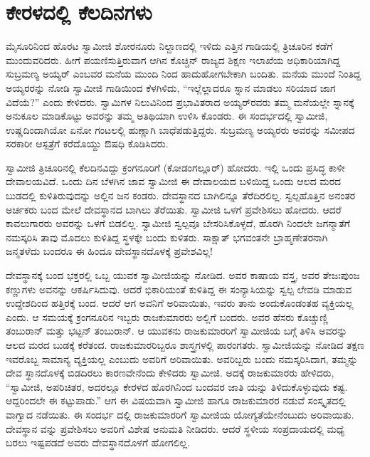 
\chapter{ಕೇರಳದಲ್ಲಿ ಕೆಲದಿನಗಳು}

\noindent

ಮೈಸೂರಿನಿಂದ ಹೊರಟ ಸ್ವಾಮೀಜಿ ಶೋರನೂರು ನಿಲ್ದಾಣದಲ್ಲಿ ಇಳಿದು ಎತ್ತಿನ ಗಾಡಿಯಲ್ಲಿ ತ್ರಿಚೂರಿನ ಕಡೆಗೆ ಮುಂದುವರಿದರು. ಹೀಗೆ ಪಯಣಿಸುತ್ತಿರುವಾಗ ಆಗಿನ ಕೊಚ್ಚಿನ್ ರಾಜ್ಯದ ಶಿಕ್ಷಣ ಇಲಾಖೆಯ ಅಧಿಕಾರಿಯಾಗಿದ್ದ ಸುಬ್ರಮಣ್ಯ ಅಯ್ಯರ್ ಎಂಬವರ ಮನೆಯ ಮುಂದಿ ನಿಂದ ಹಾದುಹೋಗಬೇಕಾಗಿ ಬಂದಿತು. ಮನೆಯ ಮುಂದೆ ನಿಂತಿದ್ದ ಅಯ್ಯರರನ್ನು ನೋಡಿ ಸ್ವಾಮೀಜಿ ಗಾಡಿಯಿಂದ ಕೆಳಗಿಳಿದು, “ಇಲ್ಲೆಲ್ಲಾದರೂ ಸ್ನಾನ ಮಾಡಲು ಸರಿಯಾದ ಜಾಗ ವಿದೆಯೆ?” ಎಂದು ಕೇಳಿದರು. ಸ್ವಾಮಿಗಳ ನಿಲುವಿನಿಂದ ಪ್ರಭಾವಿತರಾದ ಅಯ್ಯರ್​ರವರು ತಮ್ಮ ಮನೆಯಲ್ಲೇ ಸ್ನಾನಕ್ಕೆ ಅನುಕೂಲ ಮಾಡಿಕೊಟ್ಟು ಅವರನ್ನು ತಮ್ಮ ಅತಿಥಿಯಾಗಿ ಉಳಿಸಿ ಕೊಂಡರು. ಈ ಸಂದರ್ಭದಲ್ಲಿ ಸ್ವಾಮೀಜಿ, ಉಷ್ಣದಿಂದಾಗಿಯೋ ಏನೋ ಗಂಟಲಲ್ಲಿ ಹುಣ್ಣಾಗಿ ಬಾಧೆಪಡುತ್ತಿದ್ದರು. ಸುಬ್ರಮಣ್ಯ ಅಯ್ಯರರು ಅವರನ್ನು ಸಮೀಪದ ಸರಕಾರೀ ಆಸ್ಪತ್ರೆಗೆ ಕರೆದೊಯ್ದು ಔಷಧಿ ಕೊಡಿಸಿದರು.

ಸ್ವಾಮೀಜಿ ತ್ರಿಚೂರಿನಲ್ಲಿ ಕೆಲದಿನವಿದ್ದು ಕ್ರಂಗನೂರಿಗೆ (ಕೋಡಂಗಲ್ಲೂರ್​) ಹೋದರು. ಇಲ್ಲಿ ಒಂದು ಪ್ರಸಿದ್ಧ ಕಾಳೀ ದೇವಾಲಯವಿದೆ. ಒಂದು ದಿನ ಬೆಳಗಿನ ಜಾವ ಸ್ವಾಮೀಜಿ ಈ ದೇವಾಲಯದ ಬಳಿಯಿದ್ದ ಒಂದು ಆಲದ ಮರದ ಬುಡದಲ್ಲಿ ಕುಳಿತಿರುವುದನ್ನು ಅಲ್ಲಿನ ಜನ ಕಂಡರು. ದೇವಸ್ಥಾನದ ಬಾಗಿಲಿನ್ನೂ ತೆರೆದಿರಲಿಲ್ಲ. ಸ್ವಲ್ಪಹೊತ್ತಿನ ಅನಂತರ ಅರ್ಚಕರು ಬಂದ ಮೇಲೆ ದೇವಸ್ಥಾನದ ಬಾಗಿಲು ತೆರೆಯಿತು. ಸ್ವಾಮೀಜಿ ಒಳಗೆ ಪ್ರವೇಶಿಸಲು ಹೋದರು. ಆದರೆ ಕಾವಲುಗಾರರು ಅವರನ್ನು ಒಳಗೆ ಬಿಡಲಿಲ್ಲ. ಸ್ವಾಮೀಜಿ ಸ್ವಲ್ಪವೂ ಬೇಸರಿಸಿಕೊಳ್ಳದೆ, ಹೊರಗಿ ನಿಂದಲೇ ಜಗನ್ಮಾತೆಗೆ ನಮಸ್ಕರಿಸಿ ತಾವು ಮೊದಲು ಕುಳಿತಿದ್ದ ಸ್ಥಳಕ್ಕೇ ಬಂದು ಕುಳಿತರು. ಸಾಕ್ಷಾತ್ ಭಗವಂತನೇ ಬ್ರಾಹ್ಮಣೇತರನಾಗಿ ಜನ್ಮತಳೆದು ಬಂದರೂ ಈ ಹಿಂದೂ ದೇವಸ್ಥಾನದೊಳಕ್ಕೆ ಪ್ರವೇಶವಿಲ್ಲ!

ದೇವಸ್ಥಾನಕ್ಕೆ ಬಂದ ಭಕ್ತರಲ್ಲಿ ಒಬ್ಬ ಯುವಕ ಸ್ವಾಮೀಜಿಯನ್ನು ನೋಡಿದ. ಅವರ ಕಾಷಾಯ ವಸ್ತ್ರ, ಅವರ ತೇಜಃಪುಂಜ ಕಣ್ಣುಗಳು ಅವನನ್ನು ಆಕರ್ಷಿಸಿದುವು. ಆದರೆ ಭಿಕಾರಿಯಂತೆ ಕುಳಿತಿದ್ದ ಈ ಸಂನ್ಯಾಸಿಯನ್ನು ಸ್ವಲ್ಪ ಲೇವಡಿ ಮಾಡುವ ಉದ್ದೇಶದಿಂದ ಹತ್ತಿರಕ್ಕೆ ಬಂದ. ಆದರೆ ಆಗ ಅವನಿಗೆ ಅರಿವಾಯಿತು, ಇವರು ತಾನು ಅಂದುಕೊಂಡಂತಹ ವ್ಯಕ್ತಿಯಲ್ಲ ಎಂದು. ಆ ಸಮಯಕ್ಕೆ ಕ್ರಂಗನೂರಿನ ಇಬ್ಬರು ರಾಜಕುಮಾರರು ಅಲ್ಲಿಗೆ ಬಂದರು. ಅವರ ಹೆಸರು ಕೊಚ್ಚುಣ್ಣಿ ತಂಬುರಾನ್ ಮತ್ತು ಭಟ್ಟನ್ ತಂಬುರಾನ್. ಆ ಯುವಕನು ರಾಜಕುಮಾರರಿಗೆ ಸ್ವಾಮೀಜಿಯ ಬಗ್ಗೆ ತಿಳಿಸಿ ಅವರನ್ನು ಆಲದ ಮರದ ಬುಡಕ್ಕೆ ಕರೆತಂದ. ರಾಜಕುಮಾರರಿಬ್ಬರೂ ಶಾಸ್ತ್ರಗಳಲ್ಲಿ ಪಾರಂಗತರು. ಸ್ವಾಮೀಜಿಯನ್ನು ನೋಡಿದ ತಕ್ಷಣ ಇವರೊಬ್ಬ ಸಾಮಾನ್ಯ ವ್ಯಕ್ತಿಯಲ್ಲ ಎಂಬುದು ಅವರಿಗೆ ಅರಿವಾಯಿತು. ಅವರಿಬ್ಬರು ಬಂದು ನಮಸ್ಕರಿಸಿದಾಗ, ತಮ್ಮನ್ನು ದೇವ ಸ್ಥಾನದೊಳಕ್ಕೆ ಬಿಡದಿರಲು ಕಾರಣವೇನೆಂದು ಕೇಳಿದರು ಸ್ವಾಮೀಜಿ. ಅದಕ್ಕೆ ರಾಜಕುಮಾರರು ಹೇಳಿದರು, “ಸ್ವಾಮೀಜಿ, ಅಪರಿಚಿತರ, ಅದರಲ್ಲೂ ಕೇರಳದ ಹೊರಗಿನಿಂದ ಬಂದವರ ಜಾತಿ ಯನ್ನು ತಿಳಿದುಕೊಳ್ಳುವುದು ಕಷ್ಟ. ಆದ್ದರಿಂದಲೇ ಈ ಕಟ್ಟುಪಾಡು.” ಆಗ ಈ ವಿಷಯವಾಗಿ ಸ್ವಾಮೀಜಿ ಹಾಗೂ ರಾಜಕುಮಾರರ ನಡುವೆ ಸಂಸ್ಕೃತದಲ್ಲಿ ವಾಗ್ವಾದ ನಡೆಯಿತು. ಈ ಸಂದರ್ಭ ದಲ್ಲಿ ರಾಜಕುಮಾರರಿಗೆ ಸ್ವಾಮೀಜಿಯ ಯೋಗ್ಯತೆಯೇನೆಂಬುದು ಅರಿವಾಯಿತು. ದೇವಸ್ಥಾನ ವನ್ನು ಪ್ರವೇಶಿಸಲು ಅವರಿಗೆ ವಿಶೇಷ ಅನುಮತಿ ನೀಡಿದರು. ಆದರೆ ಸ್ಥಳೀಯ ಸಂಪ್ರದಾಯದಲ್ಲಿ ಮಧ್ಯೆ ಬರಲು ಇಷ್ಟಪಡದೆ ಅವರು ದೇವಸ್ಥಾನದೊಳಗೆ ಹೋಗಲಿಲ್ಲ.

